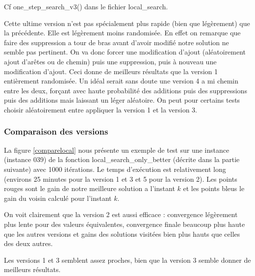\documentclass[10pt,a4paper]{article}
\begin{document}
Cf one\_step\_search\_v3() dans le fichier local\_search.

Cette ultime version n'est pas spécialement plus rapide (bien que légèrement) que la précédente. Elle est légèrement moins randomisée. En effet on remarque que faire des suppression a tour de bras avant d'avoir modifié notre solution ne semble pas pertinent. On va donc forcer une modification d'ajout (aléatoirement ajout d'arêtes ou de chemin) puis une suppression, puis à nouveau une modification d'ajout. Ceci donne de meilleurs résultats que la version 1 entièrement randomisée. Un idéal serait sans doute une version 4 a mi chemin entre les deux, forçant avec haute probabilité des additions puis des suppressions puis des additions mais laissant un léger aléatoire. On peut pour certains tests choisir aléatoirement entre appliquer la version 1 et la version 3. 


\subsubsection{Comparaison des versions}

La figure \ref{comparelocal} nous présente un exemple de test sur une instance (instance 039) de la fonction local\_search\_only\_better (décrite dans la partie suivante) avec 1000 itérations. Le temps d’exécution est relativement long (environs 25 minutes pour la version 1 et 3 et 5 pour la version 2). Les points rouges sont le gain de notre meilleure solution a l'instant $k$ et les points bleus le gain du voisin calculé pour l'instant $k$.

On voit clairement que la version 2 est aussi efficace : convergence légèrement plus lente pour des valeurs équivalentes, convergence finale beaucoup plus haute que les autres versions et gains des solutions visitées bien plus hauts que celles des deux autres. 

Les versions 1 et 3 semblent assez proches, bien que la version 3 semble donner de meilleurs résultats.
\end{document}
